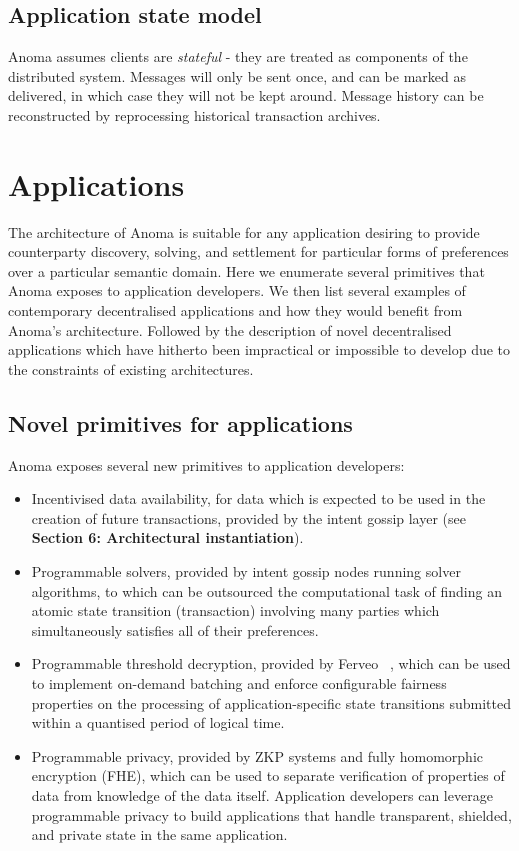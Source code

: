 \documentclass[
    9pt,            %
    commun,        %
    affiltop,       %
]{art}
\begin{document}
\subsection{Application state model}\label{application-state-model}

Anoma assumes clients are \emph{stateful} - they are treated as
components of the distributed system. Messages will only be sent once,
and can be marked as delivered, in which case they will not be kept
around. Message history can be reconstructed by reprocessing historical
transaction archives.

\section{Applications}\label{applications-secapplications}

The architecture of Anoma is suitable for any application desiring to
provide counterparty discovery, solving, and settlement for particular
forms of preferences over a particular semantic domain. Here we
enumerate several primitives that Anoma exposes to application
developers. We then list several examples of contemporary decentralised
applications and how they would benefit from Anoma's
architecture. Followed by the description of novel decentralised
applications which have hitherto been impractical or impossible to
develop due to the constraints of existing architectures.

\subsection{Novel primitives for
applications}\label{novel-primitives-for-applications}

Anoma exposes several new primitives to application developers:

\begin{itemize}

\item
  Incentivised data availability, for data which is expected to be used
  in the creation of future transactions, provided by the intent gossip
  layer (see \textbf{Section 6: Architectural instantiation}).
\item
  Programmable solvers, provided by intent gossip nodes running solver
  algorithms, to which can be outsourced the computational task of
  finding an atomic state transition (transaction) involving many
  parties which simultaneously satisfies all of their preferences.
\item
  Programmable threshold decryption, provided by Ferveo
 ~\cite{bebel2022ferveo}, which can be used to implement on-demand
  batching and enforce configurable fairness properties on the
  processing of application-specific state transitions submitted within
  a quantised period of logical time.
\item
  Programmable privacy, provided by ZKP systems and fully homomorphic
  encryption (FHE), which can be used to separate verification of
  properties of data from knowledge of the data itself. Application
  developers can leverage programmable privacy to build applications
  that handle transparent, shielded, and private state in the same
  application.
\end{itemize}
\end{document}
